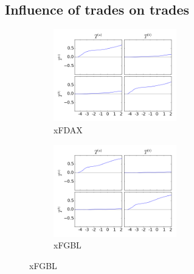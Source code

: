 \documentclass[a4paper,11pt]{article}
\begin{document}
\subsection{Influence of trades on trades}
\label{TT}
\begin{figure}[H]
        \begin{subfigure}[b]{0.45\textwidth}
                \includegraphics[width=\textwidth,height=40mm]{xFDAXPA_PB_TA_TB_LA_LB_CA_CB__TATB-_TATBcausality.png}
                \caption{xFDAX}
        \end{subfigure}
        \begin{subfigure}[b]{0.45\textwidth}
                \includegraphics[width=\textwidth,height=40mm]{xFGBLPA_PB_TA_TB_LA_LB_CA_CB__TATB-_TATBcausality.png}
                \caption{xFGBL}
        \end{subfigure}
\end{figure}
\end{document}
